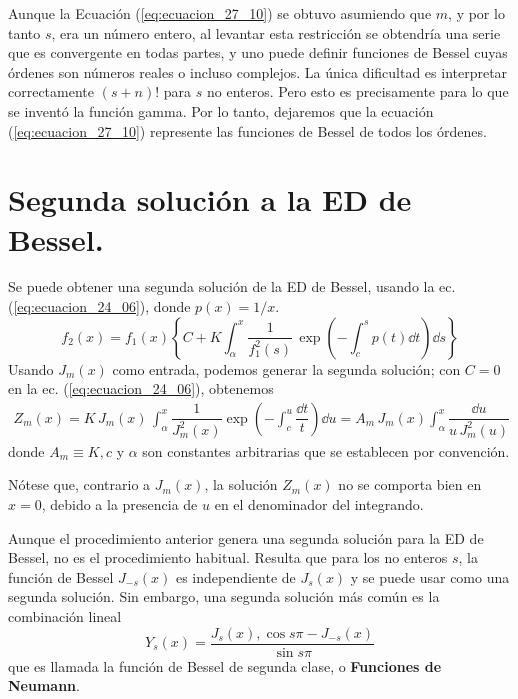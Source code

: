 Aunque la Ecuación (\ref{eq:ecuacion_27_10}) se obtuvo asumiendo que $m$, y por lo tanto $s$, era un número entero, al levantar esta restricción se obtendría una serie que es convergente en todas partes, y uno puede definir funciones de Bessel cuyas órdenes son números reales o incluso complejos. La única dificultad es interpretar correctamente $(s + n)!$ para $s$ no enteros. Pero esto es precisamente para lo que se inventó la función gamma. Por lo tanto, dejaremos que la ecuación (\ref{eq:ecuacion_27_10}) represente las funciones de Bessel de todos los órdenes.

\section{Segunda solución a la ED de Bessel.}
Se puede obtener una segunda solución de la ED de Bessel, usando la ec. (\ref{eq:ecuacion_24_06}), donde $p(x) = 1/x$.
\begin{equation}
f_{2}(x) =  f_{1}(x) \left\{ C + K \int_{\alpha}^{x} \dfrac{1}{f_{1}^{2} (s)} \, \exp( - \int_{c}^{s} p(t) \dd{t}) \dd{s} \right\}
\label{eq:ecuacion_24_06}
\end{equation}
Usando $J_{m}(x)$ como entrada, podemos generar la segunda solución; con $C = 0$ en la ec. (\ref{eq:ecuacion_24_06}), obtenemos
\begin{align*}
Z_{m}(x) = K \, J_{m}(x) \, \int_{\alpha}^{x} \dfrac{1}{J_{m}^{2}(x)} \exp(- \int_{c}^{u} \dfrac{\dd{t}}{t}) \dd{u} = A_{m} \, J_{m}(x) \int_{\alpha}^{x} \dfrac{\dd{u}}{u \, J_{m}^{2}(u)}
\end{align*}
donde $A_{m} \equiv K , c$ y $\alpha$ son constantes arbitrarias que se establecen por convención.
\par
Nótese que, contrario a $J_{m}(x)$, la solución $Z_{m}(x)$ no se comporta bien en $x = 0$, debido a la presencia de $u$ en el denominador del integrando.
\par
Aunque el procedimiento anterior genera una segunda solución para la ED  de Bessel, no es el procedimiento habitual. Resulta que para los no enteros $s$, la función de Bessel $J_{-s} (x)$ es independiente de $J_{s} (x)$ y se puede usar como una segunda solución. Sin embargo, una segunda solución más común es la combinación lineal
\begin{equation}
Y_{s} (x) = \dfrac{J_{s}(x) , \cos s \pi - J_{-s}(x)}{\sin s\pi}
\label{eq:ecuacion_27_11}
\end{equation}
que es llamada la función de Bessel de segunda clase, o \textbf{Funciones de Neumann}.
\par
